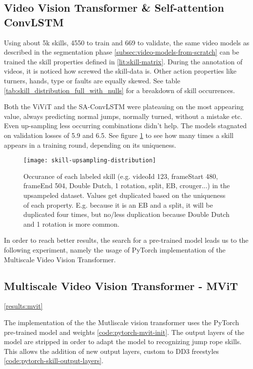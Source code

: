 \subsection{Video Vision Transformer \& Self-attention ConvLSTM}

Using about 5k skills, 4550 to train and 669 to validate, the same video models as described in the segmentation phase \ref{subsec:video-models-from-scratch} can be trained the skill properties defined in \ref{lit:skill-matrix}.
During the annotation of videos, it is noticed how screwed the skill-data is. Other action properties like turners, hands, type or faults are equally skewed. See table \ref{tab:skill_distribution_full_with_nulls} for a breakdown of skill occurrences.

Both the ViViT and the SA-ConvLSTM were plateauing on the most appearing value, always predicting normal jumps, normally turned, without a mistake etc.
Even up-sampling less occurring combinations didn't help. The models stagnated on validation losses of 5.9 and 6.5. See figure \ref{fig:skill-upsampling-distribution} to see how many times a skill appears in a training round, depending on its uniqueness.

\begin{figure}
    \centering
    \texttt{[image: skill-upsampling-distribution]}
    \caption[upsampling distribution of skills]{Occurance of each labeled skill (e.g. videoId 123, frameStart 480, frameEnd 504, Double Dutch, 1 rotation, split, EB, crouger...) in the upsampeled dataset. Values get duplicated based on the uniqueness of each property. E.g. because it is an EB and a split, it will be duplicated four times, but no/less duplication because Double Dutch and 1 rotation is more common.}
    \label{fig:skill-upsampling-distribution}
\end{figure}

In order to reach better results, the search for a pre-trained model leads us to the following experiment, namely the usage of PyTorch implementation of the Multiscale Video Vision Transformer.

\subsection{Multiscale Video Vision Transformer - MViT}
\ref{results:mvit}

The implementation of the the Mutliscale vision transformer uses the PyTorch pre-trained model and weights \ref{code:pytorch-mvit-init}.
The output layers of the model are stripped in order to adapt the model to recognizing jump rope skills. This allows the addition of new output layers, custom to DD3 freestyles \ref{code:pytorch-skill-output-layers}.

